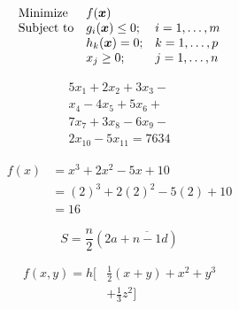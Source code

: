 \documentclass[12pt]{article}
\begin{document}
\begin{equation*}
    \begin{array}{lll}
    \mbox{Minimize} & f(\mbox{\boldmath{$x$}}) &\\

    \mbox{Subject to}
    & g_i(\mbox{\boldmath{$x$}}) \leq 0 ; & i=1,\ldots,m\\
    & h_k(\mbox{\boldmath{$x$}}) = 0 ; & k=1,\ldots,p\\
    & x_j \geq 0 ; & j=1,\ldots,n
    \end{array}
\end{equation*}





\begin{multline}
    5x_1 + 2x_2 + 3x_3 -\\
    x_4 - 4x_5 + 5x_6 +\\
    7x_7 + 3x_8 - 6x_9 -\\
    2x_{10} - 5x_{11} = 7634
\end{multline}





\begin{equation}
    \begin{split}
    f(x) &= x^3 + 2x^2 - 5x + 10\\
    &= (2)^3 + 2(2)^2 - 5(2) + 10\\
    &= 16
    \end{split}
\end{equation}



\begin{equation}
    S = \frac{n}{2}(2a+\overline{n-1}d)
\end{equation}

\begin{equation}
    \begin{split}
    f(x,y)=h \biggl[ & \frac{1}{2}(x+y)+x^2+y^3\\
    & +\frac{1}{3}z^2\biggr]
    \end{split}
\end{equation}
\end{document}
